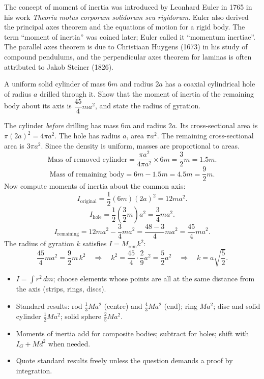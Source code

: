 \documentclass[11pt]{article}
\begin{document}
\begin{savaistu}
The concept of moment of inertia was introduced by Leonhard Euler in 1765 in his work \emph{Theoria motus corporum solidorum seu rigidorum}. Euler also derived the principal axes theorem and the equations of motion for a rigid body. The term ``moment of inertia'' was coined later; Euler called it ``momentum inertiae''. The parallel axes theorem is due to Christiaan Huygens (1673) in his study of compound pendulums, and the perpendicular axes theorem for laminas is often attributed to Jakob Steiner (1826).
\end{savaistu}

\begin{exercice}
A uniform solid cylinder of mass $6m$ and radius $2a$ has a coaxial cylindrical hole of radius $a$ drilled through it. Show that the moment of inertia of the remaining body about its axis is $\dfrac{45}{4}ma^2$, and state the radius of gyration.
\end{exercice}

\begin{corrige}
The cylinder \emph{before} drilling has mass $6m$ and radius $2a$. Its cross-sectional area is $\pi(2a)^2=4\pi a^2$. The hole has radius $a$, area $\pi a^2$. The remaining cross-sectional area is $3\pi a^2$. Since the density is uniform, masses are proportional to areas.
\[
\text{Mass of removed cylinder} = \frac{\pi a^2}{4\pi a^2}\times 6m = \frac{3}{2}m = 1.5m.
\]
\[
\text{Mass of remaining body} = 6m - 1.5m = 4.5m = \frac{9}{2}m.
\]
Now compute moments of inertia about the common axis:
\[
I_{\text{original}} = \frac12 (6m)(2a)^2 = 12ma^2.
\]
\[
I_{\text{hole}} = \frac12 \left(\frac{3}{2}m\right)a^2 = \frac{3}{4}ma^2.
\]
\[
I_{\text{remaining}} = 12ma^2 - \frac{3}{4}ma^2 = \frac{48-3}{4}ma^2 = \boxed{\frac{45}{4}ma^2}.
\]
The radius of gyration $k$ satisfies $I = M_{\text{rem}} k^2$:
\[
\frac{45}{4}ma^2 = \frac{9}{2}m\,k^2 \quad\Rightarrow\quad k^2 = \frac{45}{4}\cdot\frac{2}{9}a^2 = \frac{5}{2}a^2 \quad\Rightarrow\quad \boxed{k = a\sqrt{\frac{5}{2}}}.
\]
\end{corrige}

\begin{aretenir}
\begin{itemize}
\item $I=\displaystyle\int r^2\,dm$; choose elements whose points are all at the same distance from the axis (strips, rings, discs).
\item Standard results: rod $\tfrac13 Ma^2$ (centre) and $\tfrac43 Ma^2$ (end); ring $Ma^2$; disc and solid cylinder $\tfrac12 Ma^2$; solid sphere $\tfrac25 Ma^2$.
\item Moments of inertia add for composite bodies; subtract for holes; shift with $I_G+Md^2$ when needed.
\item Quote standard results freely unless the question demands a proof by integration.
\end{itemize}
\end{aretenir}
\end{document}
